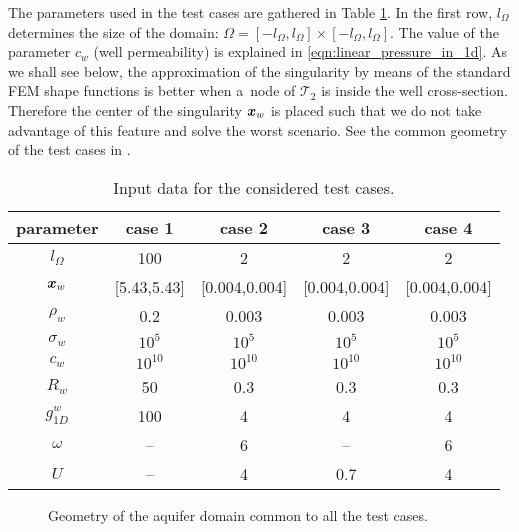 The parameters used in the test cases are gathered in Table \ref{tab:test_cases_data}.
In the first row, $l_\Omega$ determines the size of the domain: $\Omega=[-l_\Omega, l_\Omega]\times[-l_\Omega,l_\Omega]$.
The value of the parameter $c_w$ (well permeability) is explained in \eqref{eqn:linear_pressure_in_1d}.
As we shall see below, the approximation of the singularity by means of the standard FEM shape functions is better 
when a~node of $\mathcal{T}_{2}$ is inside the well cross-section. Therefore the center of the singularity $\mathbf{\boldsymbol{x}}_w$
is placed such that we do not take advantage of this feature and solve the worst scenario.
See the common geometry of the test cases in .
%
\begin{table}
\begin{center}
\begin{tabular}{c|cccc}
\toprule
parameter & case 1 & case 2 & case 3 & case 4 \\
\midrule
$l_\Omega$  & 100    & 2      & 2      & 2  \\ 
$\mathbf{\boldsymbol{x}}_w$     & [5.43,5.43]  & [0.004,0.004]  & [0.004,0.004]  & [0.004,0.004] \\
$\rho_w$    & 0.2    & 0.003  & 0.003  & 0.003 \\
$\sigma_w$  & $10^5$ & $10^5$ & $10^5$ & $10^5$ \\
$c_w$       & $10^{10}$ & $10^{10}$ & $10^{10}$ & $10^{10}$ \\
$R_w$       & 50     & 0.3    & 0.3    & 0.3 \\
$g^w_{1D}$  & 100    & 4      & 4      & 4  \\
$\omega$    & --     & 6      & --     & 6  \\
$U$         & --     & 4      & 0.7    & 4  \\
\bottomrule
\end{tabular}
\caption{Input data for the considered test cases.}
\label{tab:test_cases_data}
\end{center}
\end{table}
%

\begin{figure}[!htb]
    \centering    
    \def\svgwidth{0.35\textwidth}
        
  \caption[Geometry of the aquifer domain.]{Geometry of the aquifer domain common to all the test cases.}
  \label{fig:test_cases_geometry}
\end{figure}


